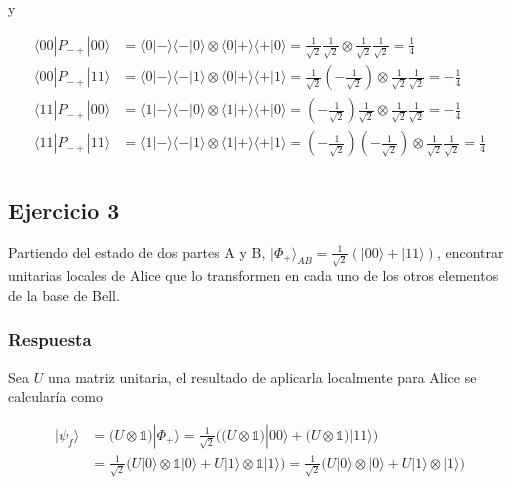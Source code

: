 \documentclass{article}
\begin{document}
y

\begin{align*}
  \langle 00|P_{-+}|00\rangle 
    &= \langle 0|-\rangle\langle -|0\rangle
      \otimes \langle 0|+\rangle\langle +|0\rangle
    = \frac{1}{\sqrt{2}}\frac{1}{\sqrt{2}}
      \otimes \frac{1}{\sqrt{2}}\frac{1}{\sqrt{2}}
    = \frac{1}{4} \\
  \langle 00|P_{-+}|11\rangle 
    &= \langle 0|-\rangle\langle -|1\rangle
      \otimes \langle 0|+\rangle\langle +|1\rangle
    = \frac{1}{\sqrt{2}}(-\frac{1}{\sqrt{2}})
      \otimes \frac{1}{\sqrt{2}}\frac{1}{\sqrt{2}}
    = -\frac{1}{4} \\
  \langle 11|P_{-+}|00\rangle 
    &= \langle 1|-\rangle\langle -|0\rangle
      \otimes \langle 1|+\rangle\langle +|0\rangle
    = (-\frac{1}{\sqrt{2}})\frac{1}{\sqrt{2}}
      \otimes \frac{1}{\sqrt{2}}\frac{1}{\sqrt{2}}
    = -\frac{1}{4} \\
  \langle 11|P_{-+}|11\rangle 
    &= \langle 1|-\rangle\langle -|1\rangle
      \otimes \langle 1|+\rangle\langle +|1\rangle
    = (-\frac{1}{\sqrt{2}})(-\frac{1}{\sqrt{2}})
      \otimes \frac{1}{\sqrt{2}}\frac{1}{\sqrt{2}}
    = \frac{1}{4} \\
\end{align*}

\subsection*{Ejercicio 3}

Partiendo del estado de dos partes A y B, 
$|\Phi_+\rangle_{AB} = \frac{1}{\sqrt{2}}(|00\rangle + |11\rangle)$,
encontrar unitarias locales de Alice que lo transformen en cada
uno de los otros elementos de la base de Bell.

\subsubsection*{Respuesta}

Sea $U$ una matriz unitaria, el resultado de aplicarla localmente
para Alice se calcularía como 

\begin{align*}
  |\psi_f\rangle 
    &= \Big(U \otimes \mathbb{1}\Big)|\Phi_+\rangle
    = \frac{1}{\sqrt{2}}\Big(
      \big(U \otimes \mathbb{1}\big)|00\rangle +
      \big(U \otimes \mathbb{1}\big)|11\rangle
    \Big) \\
    &= \frac{1}{\sqrt{2}}\Big(
      U|0\rangle \otimes \mathbb{1} |0\rangle +
      U|1\rangle \otimes \mathbb{1} |1\rangle
    \Big)
    = \frac{1}{\sqrt{2}}\Big(
      U|0\rangle \otimes |0\rangle +
      U|1\rangle \otimes |1\rangle
    \Big) 
\end{align*}
\end{document}
